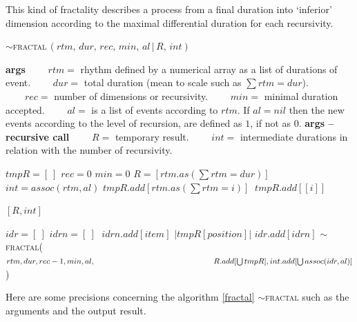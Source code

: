 This kind of fractality describes a process from a final duration into `inferior' dimension according to the maximal differential duration for each recursivity.  


\begin{algorithm}[H]
\caption{$\sim$\textsc{fractal}$\,(rtm,\, dur,\, rec,\, min,\, al\,|\,R,\, int)$}\label{fra}
\begin{algorithmic}%
\State \textbf{args}
\State $\qquad rtm =$ rhythm defined by a numerical array as a list of durations of  event.
\State $\qquad dur =$ total duration (mean to scale such as $\sum rtm = dur$).
\State $\qquad rec =$ number of dimensions or recursivity.
\State $\qquad min =$ minimal duration accepted.
\State $\qquad al =$ is a list of events according to $rtm$. If $al = nil$ then the new events according to the level of recursion, are defined as $1$, if not as $0$.
\State \textbf{args -- recursive call}
\State $\qquad R =$ temporary result.
\State $\qquad int =$ intermediate durations in relation with the number of recursivity.
\State

\State $tmpR=[\:]$
 $rec=0$
\EndIf
{} $min=0$
\EndIf
{} $R=[rtm.as(\sum rtm=dur)]$
\EndIf
{}
$int = assoc(rtm, al)$
\EndIf
{}
 $tmpR.add[rtm.as(\sum rtm=i)]$
\Else $\: tmpR.add[[i]]$
\EndIf
\EndFor

\State
{}

\Return $[R,int]$
\Else

\State $idr=[\:]$
\State $idrn=[\:]$
\Repeat $\;idrn.add[item]$ 
\Until $| tmpR[position] |$
\State $idr.add[idrn]$
\EndFor
\State $\sim$\textsc{fractal}($rtm, dur, rec-1, min, al, \newline
        \hspace*{15em} R.add[\bigcup tmpR], int.add[\bigcup assoc(idr, al)]$)

\EndIf

\end{algorithmic}
\end{algorithm}


 Here are some precisions concerning the algorithm \ref{fractal} $\sim$\textsc{fractal} such as the arguments and the output result.
 
